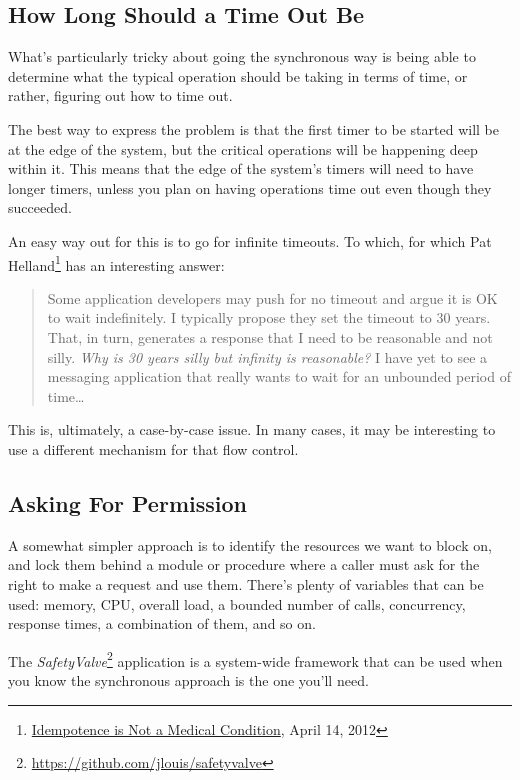 \documentclass[11pt, oneside]{book}   	%
\begin{document}
\subsection{How Long Should a Time Out Be}

What's particularly tricky about going the synchronous way is being able to determine what the typical operation should be taking in terms of time, or rather, figuring out how to time out.

The best way to express the problem is that the first timer to be started will be at the edge of the system, but the critical operations will be happening deep within it. This means that the edge of the system's timers will need to have longer timers, unless you plan on having operations time out even though they succeeded.

An easy way out for this is to go for infinite timeouts. To which, for which Pat Helland\footnote{\href{http://queue.acm.org/detail.cfm?id=2187821}{Idempotence is Not a Medical Condition}, April 14, 2012} has an interesting answer:

\begin{quote}
Some application developers may push for no timeout and argue it is OK to wait indefinitely. I typically propose they set the timeout to 30 years. That, in turn, generates a response that I need to be reasonable and not silly. \emph{Why is 30 years silly but infinity is reasonable?} I have yet to see a messaging application that really wants to wait for an unbounded period of time…
\end{quote}

This is, ultimately, a case-by-case issue. In many cases, it may be interesting to use a different mechanism for that flow control.

\subsection{Asking For Permission}

A somewhat simpler approach is to identify the resources we want to block on, and lock them behind a module or procedure where a caller must ask for the right to make a request and use them. There's plenty of variables that can be used: memory, CPU, overall load, a bounded number of calls, concurrency, response times, a combination of them, and so on.

The \emph{SafetyValve}\footnote{\href{https://github.com/jlouis/safetyvalve}{https://github.com/jlouis/safetyvalve}} application is a system-wide framework that can be used when you know the synchronous approach is the one you'll need.
\end{document}
